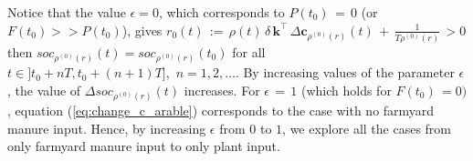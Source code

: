 \bigskip
\begin{remark}
Notice that the value $\epsilon=0$, which corresponds to $P(t_0)\, =\,0 $ (or $F(t_0)>>P(t_0)$), gives $r_0(t)\, :=\, \rho(t)\, \delta\, \mathbf{k}^\intercal\, \Delta \mathbf{c}_{\rho^{(0)}(r)}(t)\, +\,\displaystyle  \frac{1}{T \rho^{(0)}(r)}\, >0$  then  $soc_{\rho^{(0)}(r)}(t)=soc_{\rho^{(0)}(r)} (t_0)$ for all $t\in ]t_0+nT,t_0+(n+1)T],\,\, n=1,2,\dots.$ By increasing values of the parameter $\epsilon$, the value of $ \Delta soc_{\rho^{(0)}(r)}(t)$ increases. For $\epsilon\, =\, 1$ (which holds for $F(t_0)\,=0)$, equation  (\ref{eq:change_c_arable}) corresponds to the case with no farmyard manure input. Hence, by increasing $\epsilon$ from $0$ to $1$, we explore all the cases from only farmyard manure input to only plant input.   
\end{remark}
